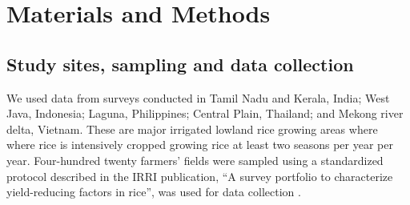 \section*{Materials and Methods}

\subsection*{Study sites, sampling and data collection}
We used data from surveys conducted in Tamil Nadu and Kerala, India; West Java, Indonesia; Laguna, Philippines; Central Plain, Thailand; and Mekong river delta, Vietnam. These are major irrigated lowland rice growing areas where where rice is intensively cropped growing rice at least two seasons per year per year. Four-hundred twenty farmers' fields were sampled using a standardized protocol described in the IRRI publication, ``A survey portfolio to characterize yield-reducing factors in rice'', was used for data collection \cite{Savarysurvey2009}.